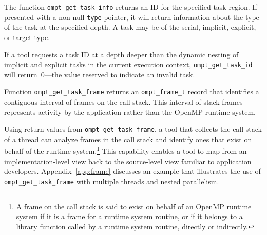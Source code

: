 \documentclass{article}
\begin{document}
The function \verb|ompt_get_task_info| returns an ID for the specified task region. If presented with a non-null \verb|type| pointer, it will return information about the type of the task at the specified depth. A task may be of the serial, implicit, explicit, or target type.

\noindent
 If a tool  requests a task ID at a depth deeper than the  dynamic nesting of implicit and explicit tasks in the current execution context,  {\tt ompt\_get\_task\_id} will return~0---the value reserved to indicate an invalid task.

 
 
 
Function \verb|ompt_get_task_frame| returns an \verb|ompt_frame_t| record that identifies a contiguous interval of frames on the call stack. This interval of stack frames represents activity by the application rather than the OpenMP runtime system. 


\noindent
Using return values from  \verb|ompt_get_task_frame|, a tool that collects the call stack of a thread can analyze  frames in the call stack and identify ones that exist on behalf of the runtime system.\footnote{A frame on the call stack is said to exist on behalf of an OpenMP runtime system if it is a frame for a runtime system routine, or if it belongs to a library function called by a runtime system routine, directly or indirectly.} 
This capability enables a tool to map from an implementation-level view back to the source-level view familiar to application developers. 
Appendix~\ref{app:frame} discusses  an example that illustrates the use of \verb|ompt_get_task_frame| with multiple threads and nested parallelism.
\end{document}
